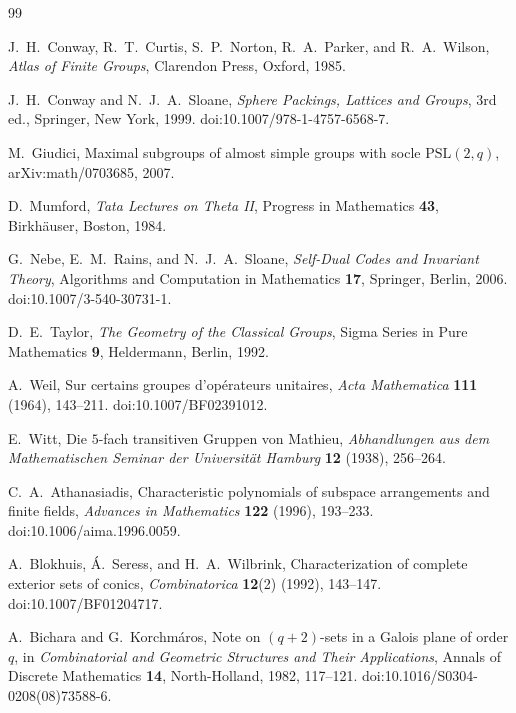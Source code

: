 \documentclass[11pt]{article}
\theoremstyle{definition}
\theoremstyle{remark}
\begin{document}

\begin{thebibliography}{99}
\small

J.~H.~Conway, R.~T.~Curtis, S.~P.~Norton, R.~A.~Parker, and R.~A.~Wilson,
\newblock \emph{Atlas of Finite Groups},
\newblock Clarendon Press, Oxford, 1985.

J.~H.~Conway and N.~J.~A.~Sloane,
\newblock \emph{Sphere Packings, Lattices and Groups}, 3rd ed.,
\newblock Springer, New York, 1999.
\newblock doi:10.1007/978-1-4757-6568-7.

M.~Giudici,
\newblock Maximal subgroups of almost simple groups with socle
$\mathrm{PSL}(2,q)$,
\newblock arXiv:math/0703685, 2007.

D.~Mumford,
\newblock \emph{Tata Lectures on Theta II},
\newblock Progress in Mathematics \textbf{43}, Birkh\"auser, Boston, 1984.

G.~Nebe, E.~M.~Rains, and N.~J.~A.~Sloane,
\newblock \emph{Self-Dual Codes and Invariant Theory},
\newblock Algorithms and Computation in Mathematics \textbf{17},
Springer, Berlin, 2006.
\newblock doi:10.1007/3-540-30731-1.

D.~E.~Taylor,
\newblock \emph{The Geometry of the Classical Groups},
\newblock Sigma Series in Pure Mathematics \textbf{9}, Heldermann,
Berlin, 1992.

A.~Weil,
\newblock Sur certains groupes d'op\'erateurs unitaires,
\newblock \emph{Acta Mathematica} \textbf{111} (1964), 143--211.
\newblock doi:10.1007/BF02391012.

E.~Witt,
\newblock Die $5$-fach transitiven Gruppen von Mathieu,
\newblock \emph{Abhandlungen aus dem Mathematischen Seminar der
Universit\"at Hamburg} \textbf{12} (1938), 256--264.

C.~A.~Athanasiadis,
\newblock Characteristic polynomials of subspace arrangements and finite fields,
\newblock \emph{Advances in Mathematics} \textbf{122} (1996), 193--233.
\newblock doi:10.1006/aima.1996.0059.

A.~Blokhuis, Á.~Seress, and H.~A.~Wilbrink,
\newblock Characterization of complete exterior sets of conics,
\newblock \emph{Combinatorica} \textbf{12}(2) (1992), 143--147.
\newblock doi:10.1007/BF01204717.

A.~Bichara and G.~Korchm\'aros,
\newblock Note on $(q+2)$-sets in a Galois plane of order $q$,
\newblock in \emph{Combinatorial and Geometric Structures and Their
Applications}, Annals of Discrete Mathematics \textbf{14}, North-Holland,
1982, 117--121.
\newblock doi:10.1016/S0304-0208(08)73588-6.


\end{thebibliography}
\end{document}
